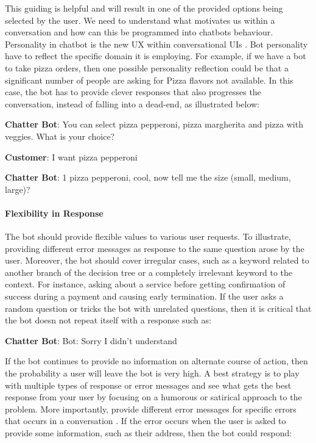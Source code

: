 This guiding is helpful and will result in one of the provided options being selected by the user. We need to understand what motivates us within a conversation and how can this be programmed into chatbots behaviour. Personality in chatbot is the new UX within conversational UIs \cite{fadhil2018}. Bot personality have to reflect the specific domain it is employing. For example, if we have a bot to take pizza orders, then one possible personality reflection could be that a significant number of people are asking for Pizza flavors not available. In this case, the bot has to provide clever responses that also progresses the conversation, instead of falling into a dead-end, as illustrated below:
\bigskip

{ \selectfont

  \color{red}
  \textbf{Chatter Bot}: You can select pizza pepperoni, pizza margherita and pizza with veggies. What is your choice?
  \bigskip
  
  \color{blue}
  \textbf{Customer}: I want pizza pepperoni
  \bigskip
  
  \color{red}
  \textbf{Chatter Bot}:  1 pizza pepperoni, cool, now tell me the size (small, medium, large)?
  \bigskip
  
  \color{black}
}


\paragraph{Flexibility in Response}
The bot should provide flexible values to various user requests. To illustrate, providing different error messages as response to the same question arose by the user. Moreover, the bot should cover irregular cases, such as a keyword related to another branch of the decision tree or a completely irrelevant keyword to the context. For instance, asking about a service before getting confirmation of success during a payment and causing early termination. If the user asks a random question or tricks the bot with unrelated questions, then it is critical that the bot doesn not repeat itself with a response such as:
\bigskip

{ \selectfont

  \color{red}
  \textbf{Chatter Bot}: Bot: Sorry I didn’t understand
  \bigskip
  
  \color{black}
}

If the bot continues to provide no information on alternate course of action, then the probability a user will leave the bot is very high. A best strategy is to play with multiple types of response or error messages and see what gets the best response from your user by focusing on a humorous or satirical approach to the problem. More importantly, provide different error messages for specific errors that occurs in a conversation \cite{fadhil2018}. If the error occurs when the user is asked to provide some information, such as their address, then the bot could respond:
\bigskip

